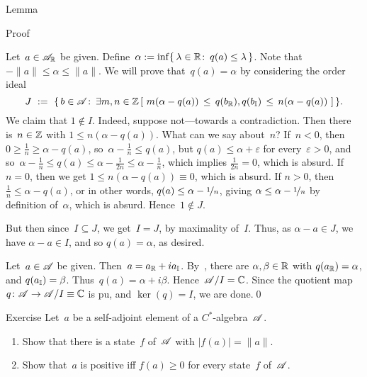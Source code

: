 \documentclass[main]{subfiles}
\begin{document}
\begin{parsec}
\begin{point}{Lemma}
\begin{point}{Proof}
\begin{point}%
Let~$a\in \mathscr{A}_{\mathbb{R}}$ be given.
Define~$\alpha := \inf\{\,\lambda\in\mathbb{R}\colon\, q(a)\leq \lambda\,\}$.
Note that $-\|a\| \leq \alpha\leq \|a\|$.
We will prove that~$q(a)=\alpha$
by considering the order ideal
\begin{equation*}
J\ := \ \{\,b\in \scrA\colon\, \exists m,n\in \Z\,[\ 
m(\alpha-q(a)) \,\leq\, q(\Real{b}),q(\Imag{b})\,\leq\, n(\alpha-q(a))\ ]\,\}.
\end{equation*}
We claim that $1\notin I$.
Indeed, suppose not---towards a contradiction.
Then there is~$n\in \mathbb{Z}$
with $1\leq n(\alpha-q(a))$.
What can we say about~$n$?
If~$n<0$,
then $0\geq \frac{1}{n}\geq \alpha-q(a)$,
so~$\alpha-\frac{1}{n} \leq q(a)$,
but $q(a)\leq \alpha+\varepsilon$
for every~$\varepsilon>0$,
and so~$\alpha-\frac{1}{n}\leq q(a)\leq \alpha-\frac{1}{2n}
\leq \alpha-\frac{1}{n}$,
which implies $\frac{1}{2n}=0$,
which is absurd.
If $n=0$,
then we get $1\leq n(\alpha-q(a))\equiv 0$, which is absurd.
If $n> 0$,
then $\frac{1}{n}\leq \alpha-q(a)$,
or in other words,
 $q(a) \leq \alpha - \nicefrac{1}{n}$,
giving $\alpha \leq \alpha-\nicefrac{1}{n}$
by definition of~$\alpha$,
which is absurd.
Hence~$1\notin J$.

But then since~$I\subseteq J$,
we get~$I=J$, by maximality of~$I$.
Thus, as $\alpha-a\in J$, we have $\alpha-a\in I$,
and so $q(a)=\alpha$, as desired.
\end{point}
\begin{point}%
Let~$a\in \mathscr{A}$ be given.
Then~$a=a_{\mathbb{R}}+ia_{\mathbb{I}}$.
By~,
there are $\alpha,\beta\in \mathbb{R}$ with $q(a_{\mathbb{R}})=\alpha$,
and $q(a_{\mathbb{I}})=\beta$.
Thus~$q(a)=\alpha+i\beta$.
Hence~$\mathscr{A}/I=\mathbb{C}$.
Since the quotient map $q\colon \mathscr{A}\to \mathscr{A}/I\equiv \mathbb{C}$
is pu, and $\ker(q)=I$, we are done.\qed
\end{point}
\end{point}
\begin{point}{Exercise}%
Let~$a$ be a self-adjoint element of a $C^*$-algebra~$\mathscr{A}$.
\begin{enumerate}
\item
Show that there is a state~$f$ of~$\mathscr{A}$ with $\left|f(a)\right|=\|a\|$.
\item
Show that~$a$ is positive iff $f(a)\geq 0$ for every state~$f$ of~$\mathscr{A}$.
\end{enumerate}
\end{point}
\end{point}
\end{parsec}
\end{document}
